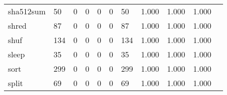 \begin{longtable}{lp{1.2cm}p{1.2cm}p{1.2cm}p{1.2cm}p{1.2cm}p{1.2cm}p{1.2cm}p{1.2cm}p{1.2cm}p{1.2cm}}
sha512sum &                                    50 &                                                  0 &                                                  0 &                                                  0 &                                                  0 &                                                 50 &                                         1.000 &                                              1.000 &                                              1.000 \\
shred     &                                    87 &                                                  0 &                                                  0 &                                                  0 &                                                  0 &                                                 87 &                                         1.000 &                                              1.000 &                                              1.000 \\
shuf      &                                   134 &                                                  0 &                                                  0 &                                                  0 &                                                  0 &                                                134 &                                         1.000 &                                              1.000 &                                              1.000 \\
sleep     &                                    35 &                                                  0 &                                                  0 &                                                  0 &                                                  0 &                                                 35 &                                         1.000 &                                              1.000 &                                              1.000 \\
sort      &                                   299 &                                                  0 &                                                  0 &                                                  0 &                                                  0 &                                                299 &                                         1.000 &                                              1.000 &                                              1.000 \\
split     &                                    69 &                                                  0 &                                                  0 &                                                  0 &                                                  0 &                                                 69 &                                         1.000 &                                              1.000 &                                              1.000 \\

\end{longtable}
